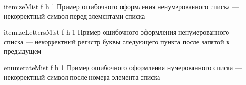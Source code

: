 {itemizeMist} %
{f} %
{h} %
{1\textwidth} %
{Пример ошибочного оформления ненумерованного списка --- некорректный символ перед элементами списка} %

{itemizeLettersMist} %
{f} %
{h} %
{1\textwidth} %
{Пример ошибочного оформления ненумерованного списка --- некорректный регистр буквы следующего пункта после запятой в предыдущем} %

{enumerateMist} %
{f} %
{h} %
{1\textwidth} %
{Пример ошибочного оформления нумерованного списка --- некорректный символ после номера элемента списка} %
